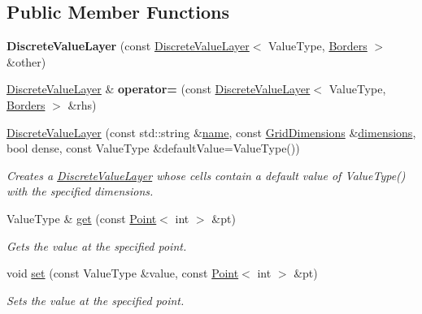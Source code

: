 \subsection*{Public Member Functions}
\begin{DoxyCompactItemize}
\item 
\hypertarget{classrepast_1_1_discrete_value_layer_aae74c061422347ebccf0163db1f0998f}{{\bfseries Discrete\-Value\-Layer} (const \hyperlink{classrepast_1_1_discrete_value_layer}{Discrete\-Value\-Layer}$<$ Value\-Type, \hyperlink{classrepast_1_1_borders}{Borders} $>$ \&other)}\label{classrepast_1_1_discrete_value_layer_aae74c061422347ebccf0163db1f0998f}

\item 
\hypertarget{classrepast_1_1_discrete_value_layer_aaea82e29c4e38e63e7921b1d83895654}{\hyperlink{classrepast_1_1_discrete_value_layer}{Discrete\-Value\-Layer} \& {\bfseries operator=} (const \hyperlink{classrepast_1_1_discrete_value_layer}{Discrete\-Value\-Layer}$<$ Value\-Type, \hyperlink{classrepast_1_1_borders}{Borders} $>$ \&rhs)}\label{classrepast_1_1_discrete_value_layer_aaea82e29c4e38e63e7921b1d83895654}

\item 
\hyperlink{classrepast_1_1_discrete_value_layer_a146b16f54f9b13ccfeb6462f359d0203}{Discrete\-Value\-Layer} (const std\-::string \&\hyperlink{classrepast_1_1_base_value_layer_a27277765ee50f9d5446b253f77797f5c}{name}, const \hyperlink{classrepast_1_1_grid_dimensions}{Grid\-Dimensions} \&\hyperlink{classrepast_1_1_value_layer_a51fe7fe718305d0c006bc465a14ef0e3}{dimensions}, bool dense, const Value\-Type \&default\-Value=Value\-Type())
\begin{DoxyCompactList}\small\item\em Creates a \hyperlink{classrepast_1_1_discrete_value_layer}{Discrete\-Value\-Layer} whose cells contain a default value of Value\-Type() with the specified dimensions. \end{DoxyCompactList}\item 
Value\-Type \& \hyperlink{classrepast_1_1_discrete_value_layer_abf7996a02382f6a28b3d993a156386c7}{get} (const \hyperlink{classrepast_1_1_point}{Point}$<$ int $>$ \&pt)
\begin{DoxyCompactList}\small\item\em Gets the value at the specified point. \end{DoxyCompactList}\item 
void \hyperlink{classrepast_1_1_discrete_value_layer_a2070dcc808c4d5b48de96b278f8a8d89}{set} (const Value\-Type \&value, const \hyperlink{classrepast_1_1_point}{Point}$<$ int $>$ \&pt)
\begin{DoxyCompactList}\small\item\em Sets the value at the specified point. \end{DoxyCompactList}\end{DoxyCompactItemize}



